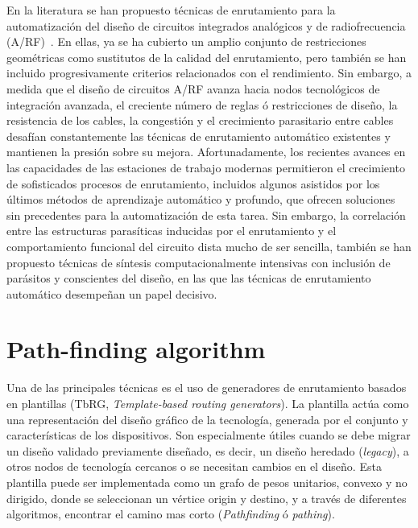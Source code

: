 \documentclass[reprint,amsmath,amssymb,aps]{revtex4-2}
\begin{document}
En la literatura se han propuesto técnicas de enrutamiento para la automatización del diseño de circuitos integrados analógicos y de radiofrecuencia (A/RF)~\cite{unutulmaz, martins}. En ellas, ya se ha cubierto un amplio conjunto de restricciones geométricas como sustitutos de la calidad del enrutamiento, pero también se han incluido progresivamente criterios relacionados con el rendimiento. Sin embargo, a medida que el diseño de circuitos A/RF avanza hacia nodos tecnológicos de integración avanzada, el creciente número de reglas ó restricciones de diseño, la resistencia de los cables, la congestión y el crecimiento parasitario entre cables desafían constantemente las técnicas de enrutamiento automático existentes y mantienen la presión sobre su mejora. Afortunadamente, los recientes avances en las capacidades de las estaciones de trabajo modernas permitieron el crecimiento de sofisticados procesos de enrutamiento, incluidos algunos asistidos por los últimos métodos de aprendizaje automático y profundo, que ofrecen soluciones sin precedentes para la automatización de esta tarea. Sin embargo, la correlación entre las estructuras parasíticas inducidas por el enrutamiento y el comportamiento funcional del circuito dista mucho de ser sencilla, también se han propuesto técnicas de síntesis computacionalmente intensivas con inclusión de parásitos y conscientes del diseño, en las que las técnicas de enrutamiento automático desempeñan un papel decisivo.\\

\section{Path-finding algorithm}

Una de las principales técnicas es el uso de generadores de enrutamiento basados en plantillas (TbRG, \textit{Template-based routing generators}). La plantilla actúa como una representación del diseño gráfico de la tecnología, generada por el conjunto y características de los dispositivos. Son especialmente útiles cuando se debe migrar un diseño validado previamente diseñado, es decir, un diseño heredado (\textit{legacy}), a otros nodos de tecnología cercanos o se necesitan cambios en el diseño. Esta plantilla puede ser implementada como un grafo de pesos unitarios, convexo y no dirigido, donde se seleccionan un vértice origin y destino, y a través de diferentes algoritmos, encontrar el camino mas corto (\textit{Pathfinding} ó \textit{pathing}).

\end{document}
